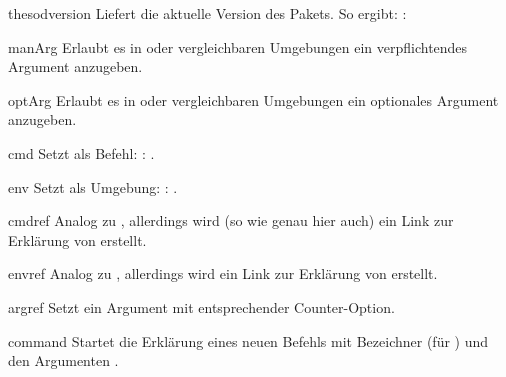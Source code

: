 \documentclass{sopra-base}
\begin{document}
\begin{command}{thesodversion}{}
    Liefert die aktuelle Version des Pakets. So ergibt: : \thesodversion\\
\end{command}

\begin{command}{manArg}{}
    Erlaubt es in  oder vergleichbaren Umgebungen ein verpflichtendes Argument anzugeben. 
\end{command}

\begin{command}{optArg}{}
    Erlaubt es in  oder vergleichbaren Umgebungen ein optionales Argument anzugeben.
\end{command}

\begin{command}{cmd}{}
    Setzt  als Befehl: : .
\end{command}

\begin{command}{env}{}
    Setzt  als Umgebung: : .
\end{command}

\begin{command}{cmdref}{}
    Analog zu , allerdings wird (so wie genau hier auch) ein Link zur Erklärung von  erstellt.
\end{command}

\begin{command}{envref}{}
    Analog zu , allerdings wird ein Link zur Erklärung von  erstellt.
\end{command}

\begin{command}{argref}{}
    Setzt ein Argument mit entsprechender Counter-Option.
\end{command}


\begin{environment}{command}{}
    Startet die Erklärung eines neuen Befehls mit Bezeichner  (für ) und den Argumenten .
\end{environment}
\end{document}

